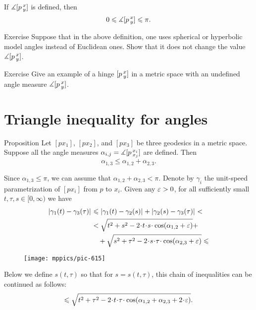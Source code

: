 If $\measuredangle[p\,{}^{x}_{y}]$ is defined, then
\[0\leqslant \measuredangle[p\,{}^{x}_{y}]\leqslant \pi.\]

\begin{thm}{Exercise}\label{ex:angkK}
Suppose that in the above definition, one uses spherical or hyperbolic model angles instead of Euclidean ones.
Show that it does not change the value $\measuredangle[p\,{}^{x}_{y}]$.
\end{thm}


\begin{thm}{Exercise}\label{ex:undefined-angle}
Give an example of a hinge $[p\,{}^{x}_{y}]$ in a metric space with an undefined angle measure $\measuredangle[p\,{}^{x}_{y}]$.
\end{thm}

\section{Triangle inequality for angles}

\begin{thm}{Proposition}\label{claim:angle-3angle-inq}
Let  $[px_1]$, $[px_2]$, and $[px_3]$ be three geodesics in a metric space.
Suppose all the angle measures $\alpha_{i, j}=\measuredangle[p\,{}^{x_i}_{x_j}]$ are defined.
Then 
\[\alpha_{1,3}\le \alpha_{1,2}+\alpha_{2,3}.\]

\end{thm}



Since $\alpha_{1,3}\le\pi$, we can assume that $\alpha_{1,2}+\alpha_{2,3}< \pi$.
Denote by $\gamma_i$ the unit-speed parametrization of $[px_i]$ from $p$ to $x_i$.
Given any $\varepsilon>0$, for all sufficiently small $t,\tau,s\in[0,\infty)$ we have
\begin{align*}
\dist{\gamma_1(t)}{\gamma_3(\tau)}{}
&\le 
\dist{\gamma_1(t)}{\gamma_2(s)}{}+\dist{\gamma_2(s)}{\gamma_3(\tau)}{}<\\
&<
\sqrt{t^2+s^2-2\cdot t\cdot  s\cdot \cos(\alpha_{1,2}+\eps)} +
\\
&\quad+\sqrt{s^2+\tau^2-2\cdot s\cdot \tau\cdot \cos(\alpha_{2,3}+\eps)}\le
\end{align*}

\begin{wrapfigure}{o}{30 mm}
\vskip-16mm
\centering
\texttt{[image: mppics/pic-615]}
\vskip0mm
\end{wrapfigure}

Below we define 
$s(t,\tau)$ so that for 
$s=s(t,\tau)$, this chain of inequalities can be continued as follows:
\[\le
\sqrt{t^2+\tau^2-2\cdot t\cdot \tau\cdot \cos(\alpha_{1,2}+\alpha_{2,3}+2\cdot \eps)}.
\]

